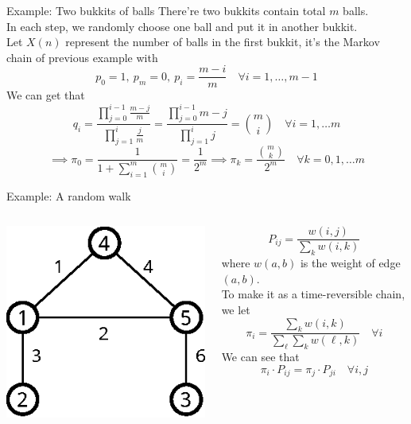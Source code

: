 \documentclass[mathserif]{beamer}
\begin{document}
\begin{frame}{Example: Two bukkits of balls}
There're two bukkits contain total $m$ balls.\\
In each step, we randomly choose one ball and put it in another bukkit.\\
Let $X(n)$ represent the number of balls in the first bukkit, it's the Markov chain of previous example with
\[
p_0 = 1,~p_m = 0,~p_i = \frac{m-i}{m} \quad\forall i=1,\ldots,m-1
\]
We can get that
\[
q_i = \frac{\prod_{j=0}^{i-1}\frac{m-j}{m}}{\prod_{j=1}^{i}\frac{j}{m}} = 
\frac{\prod_{j=0}^{i-1}m-j}{\prod_{j=1}^{i}j} = \binom{m}{i} \quad\forall i=1,\ldots m
\]
\[
\implies \pi_0 = \frac{1}{1 + \sum_{i=1}^m \binom{m}{i}} = 
\frac{1}{2^m} \implies \pi_k = \frac{\binom{m}{k}}{2^m} \quad\forall k=0,1,\ldots m
\]
\end{frame}

\begin{frame}{Example: A random walk}
\begin{columns}
\begin{column}{0.4\textwidth}
\begin{center}
\includegraphics[scale=1.0]{random_walk}
\end{center}
\end{column}
\begin{column}{0.6\textwidth}
\[
P_{ij} = \frac{w(i,j)}{\sum_k w(i,k)}
\]
where $w(a,b)$ is the weight of edge $(a,b)$.\\
To make it as a time-reversible chain, we let
\[
\pi_i = \frac{\sum_k w(i,k)}{\sum_\ell \sum_k w(\ell,k)} \quad\forall i
\]
We can see that
\[
\pi_i\cdot P_{ij} = \pi_j\cdot P_{ji} \quad\forall i,j
\]
\end{column}
\end{columns}
\end{frame}
\end{document}
